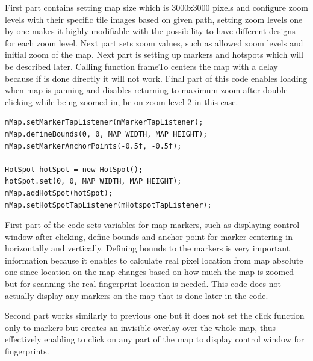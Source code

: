 First part contains setting map size which is 3000x3000 pixels and configure zoom levels with their specific tile images based on given path, setting zoom levels one by one makes it highly modifiable with the possibility to have different designs for each zoom level. Next part sets zoom values, such as allowed zoom levels and initial zoom of the map. Next part is setting up markers and hotspots which will be described later. Calling function frameTo centers the map with a delay because if is done directly it will not work. Final part of this code enables loading when map is panning and disables returning to maximum zoom after double clicking while being zoomed in, be on zoom level 2 in this case.

\begin{lstlisting}[caption=Setup markers and hotspots]
mMap.setMarkerTapListener(mMarkerTapListener);
mMap.defineBounds(0, 0, MAP_WIDTH, MAP_HEIGHT);
mMap.setMarkerAnchorPoints(-0.5f, -0.5f);

HotSpot hotSpot = new HotSpot();
hotSpot.set(0, 0, MAP_WIDTH, MAP_HEIGHT);
mMap.addHotSpot(hotSpot);
mMap.setHotSpotTapListener(mHotspotTapListener);
\end{lstlisting}

First part of the code sets variables for map markers, such as displaying control window after clicking, define bounds and anchor point for marker centering in horizontally and vertically. Defining bounds to the markers is very important information because it enables to calculate real pixel location from map absolute one since location on the map changes based on how much the map is zoomed but for scanning the real fingerprint location is needed.  This code does not actually display any markers on the map that is done later in the code.

Second part works similarly to previous one but it does not set the click function only to markers but creates an invisible overlay over the whole map, thus effectively enabling to click on any part of the map to display control window for fingerprints.